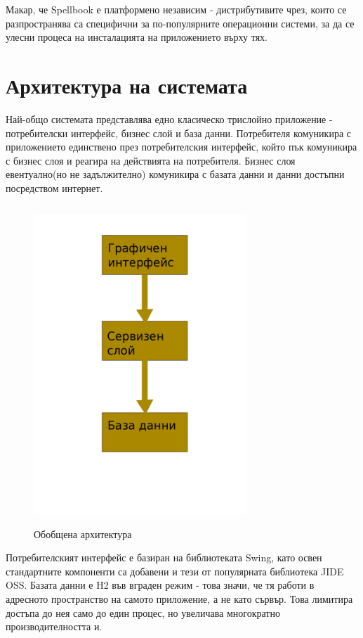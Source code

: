 Макар, че Spellbook е платформено независим - дистрибутивите чрез,
които се разпространява са специфични за по-популярните операционни
системи, за да се улесни процеса на инсталацията на приложението върху
тях.  
\section{Архитектура на системата}
Най-общо системата представлява едно класическо трислойно приложение -
потребителски интерфейс, бизнес слой и база данни. Потребителя
комуникира с приложението единствено през потребителския интерфейс,
който пък комуникира с бизнес слоя и реагира на действията на
потребителя. Бизнес слоя евентуално(но не задължително) комуникира с
базата данни и данни достъпни посредством интернет.

\begin{figure}[htbp]
  \caption{Обобщена архитектура}
  \centering
  \includegraphics[width=80mm, height=120mm]{images/basic_arch.png}
\end{figure}

Потребителският интерфейс е базиран на библиотеката Swing, като освен
стандартните компоненти са добавени и тези от популярната библиотека
JIDE OSS. Базата данни е H2 във вграден режим - това значи, че тя
работи в адресното пространство на самото приложение, а не като
сървър. Това лимитира достъпа до нея само до един процес, но увеличава
многократно производителността и.

